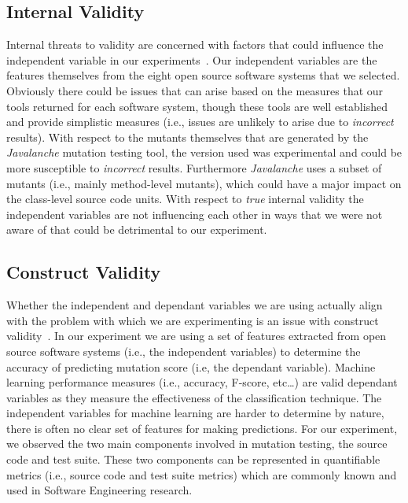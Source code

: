 \subsection{Internal Validity}
\label{subsec:experiment_internal_validity}
Internal threats to validity are concerned with factors that could influence the independent variable in our experiments~\cite{WRH+00,WKP10}. Our independent variables are the features themselves from the eight open source software systems that we selected. Obviously there could be issues that can arise based on the measures that our tools returned for each software system, though these tools are well established and provide simplistic measures (i.e., issues are unlikely to arise due to \emph{incorrect} results). With respect to the mutants themselves that are generated by the \emph{Javalanche} mutation testing tool, the version used was experimental and could be more susceptible to \emph{incorrect} results. Furthermore \emph{Javalanche} uses a subset of mutants (i.e., mainly method-level mutants), which could have a major impact on the class-level source code units. With respect to \emph{true} internal validity the independent variables are not influencing each other in ways that we were not aware of that could be detrimental to our experiment.


\subsection{Construct Validity}
\label{subsec:experiment_construct_validity}
Whether the independent and dependant variables we are using actually align with the problem with which we are experimenting is an issue with construct validity~\cite{WRH+00,WKP10}. In our experiment we are using a set of features extracted from open source software systems (i.e., the independent variables) to determine the accuracy of predicting mutation score (i.e, the dependant variable). Machine learning performance measures (i.e., accuracy, F-score, etc\ldots) are valid dependant variables as they measure the effectiveness of the classification technique. The independent variables for machine learning are harder to determine by nature, there is often no clear set of features for making predictions. For our experiment, we observed the two main components involved in mutation testing, the source code and test suite. These two components can be represented in quantifiable metrics (i.e., source code and test suite metrics) which are commonly known and used in Software Engineering research.


